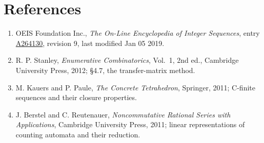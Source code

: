 \documentclass[11pt]{article}
\theoremstyle{definition}
\begin{document}
\section{References}

\begin{enumerate}

\item OEIS Foundation Inc., \emph{The On-Line Encyclopedia of Integer Sequences}, entry \href{https://oeis.org/A264130}{A264130}, revision 9, last modified Jan 05 2019.

\item R. P. Stanley, \emph{Enumerative Combinatorics}, Vol.~1, 2nd ed., Cambridge University Press, 2012; \S4.7, the transfer-matrix method.

\item M. Kauers and P. Paule, \emph{The Concrete Tetrahedron}, Springer, 2011; C-finite sequences and their closure properties.

\item J. Berstel and C. Reutenauer, \emph{Noncommutative Rational Series with Applications}, Cambridge University Press, 2011; linear representations of counting automata and their reduction.

\end{enumerate}
\end{document}
